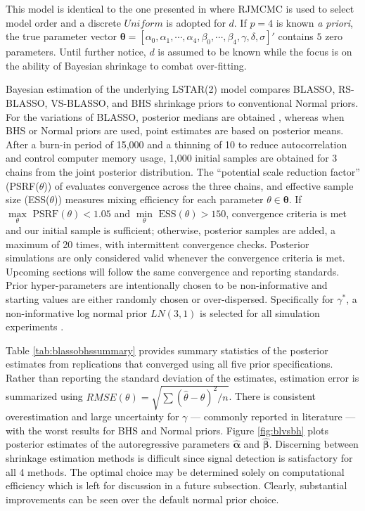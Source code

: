  This model is identical to the one presented in \cite{Lopes2006} where RJMCMC is used to select model order and a discrete $Uniform$ is adopted for $d$. If $p=4$ is known \textit{a priori}, the true parameter vector $\bm{\theta}=[\alpha_0, \alpha_1, \cdots, \alpha_4, \beta_0,\cdots,\beta_4, \gamma,\delta,\sigma]'$ contains $5$ zero parameters. Until further notice, $d$ is assumed to be known while the focus is on the ability of Bayesian shrinkage to combat over-fitting.

Bayesian estimation of the underlying LSTAR(2) model compares  BLASSO, RS-BLASSO, VS-BLASSO, and BHS shrinkage priors to conventional Normal priors. For the variations of BLASSO, posterior medians are obtained \citep{Park2008}, whereas when BHS \citep{Carvalho2009} or Normal priors are used, point estimates are based on posterior means. After a burn-in period of 15,000 and a thinning of 10 to reduce autocorrelation and control computer memory usage, 1,000 initial samples are obtained for 3 chains from the joint posterior distribution. The ``potential scale reduction factor'' (PSRF($\theta$)) of \cite{Gelman1992} evaluates convergence across the three chains, and effective sample size (ESS($\theta$)) measures mixing efficiency for each parameter $\theta \in \bm{\theta}$.  If $\underset{\theta}{\max} \textrm{ PSRF}(\theta)<1.05$ and $\underset{\theta}{\min} \textrm{ ESS}(\theta)>150$, convergence criteria is met and our initial sample is sufficient; otherwise, posterior samples are added, a maximum of 20 times, with intermittent convergence checks. Posterior simulations are only considered valid whenever the convergence criteria is met. Upcoming sections will follow the same convergence and reporting standards. Prior hyper-parameters are intentionally chosen to be non-informative and starting values are either randomly chosen or over-dispersed. Specifically for $\gamma^*$, a non-informative log normal prior $LN(3,1)$ is selected for all  simulation experiments \citep{Gerlach2008}. 

Table  \ref{tab:blassobhssummary} provides summary statistics of the posterior estimates from replications that converged using all five prior specifications. Rather than reporting the standard deviation of the estimates, estimation error is summarized using $RMSE(\theta)=\sqrt{\sum(\hat{\theta}-\theta)^2/n}$. There is consistent overestimation and large uncertainty for $\gamma$ --- commonly reported in literature \citep{Livingston2017} --- with the worst results for BHS and Normal priors. Figure \ref{fig:blvsbh} plots posterior estimates of the autoregressive parameters $\hat{\bm{\alpha}}$ and $\hat{\bm{\beta}}$. Discerning between shrinkage estimation methods is difficult since signal detection is satisfactory for all 4 methods. The optimal choice may be determined solely on computational efficiency which is left for discussion in a future subsection. Clearly, substantial improvements can be seen over the default normal prior choice.

